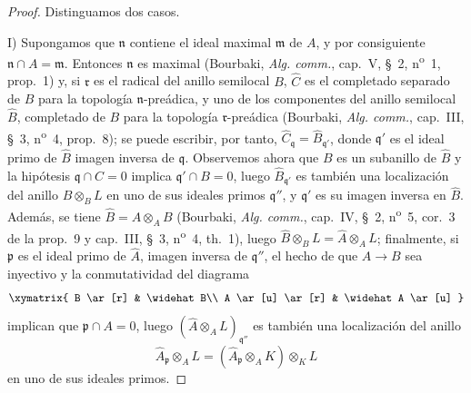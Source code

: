 \begin{proof}
Distinguamos dos casos.

I) Supongamos que $\mathfrak n$ contiene el ideal maximal $\mathfrak m$ de
$A$, y por consiguiente $\mathfrak n\cap A=\mathfrak m$. Entonces
$\mathfrak n$ es maximal (Bourbaki, \emph{Alg. comm.}, cap.~V, §~2,
n\textsuperscript{o}~1, prop.~1) y, si $\mathfrak r$ es el radical del anillo
semilocal $B$, $\widehat C$ es el completado separado de $B$ para la topología
$\mathfrak n$-preádica, y uno de los componentes del anillo semilocal
$\widehat B$, completado de $B$ para la topología $\mathfrak r$-preádica
(Bourbaki, \emph{Alg. comm.}, cap.~III, §~3, n\textsuperscript{o}~4,
prop.~8); se puede escribir, por tanto,
$\widehat C_\mathfrak q=\widehat B_{\mathfrak q'}$, donde $\mathfrak q'$ es
el ideal primo de $\widehat B$ imagen inversa de $\mathfrak q$. Observemos
ahora que $B$ es un subanillo de $\widehat B$ y la hipótesis
$\mathfrak q\cap C=0$ implica $\mathfrak q'\cap B=0$, luego
$\widehat B_{\mathfrak q'}$ es también una localización del anillo
$\widehat B\otimes_B L$ en uno de sus ideales primos $\mathfrak q''$, y
$\mathfrak q'$ es su imagen inversa en $\widehat B$. Además, se tiene
$\widehat B=\widehat A\otimes_A B$ (Bourbaki, \emph{Alg. comm.}, cap.~IV,
§~2, n\textsuperscript{o}~5, cor.~3 de la prop.~9 y cap.~III, §~3,
n\textsuperscript{o}~4, th.~1), luego
$\widehat B\otimes_B L=\widehat A\otimes_A L$; finalmente, si $\mathfrak p$
es el ideal primo de $\widehat A$, imagen inversa de $\mathfrak q''$, el
hecho de que $A\to B$ sea inyectivo y la conmutatividad del diagrama
\[
  \xymatrix{
    B \ar[r] & \widehat B\\
    A \ar[u] \ar[r] & \widehat A \ar[u]
  }
\]
implican que $\mathfrak p\cap A=0$, luego
$(\widehat A\otimes_A L)_{\mathfrak q''}$ es también una localización del
anillo
\[
  \widehat A_\mathfrak p\otimes_A L
  =(\widehat A_\mathfrak p\otimes_A K)\otimes_K L
\]
en uno de sus ideales primos.



\end{proof}
